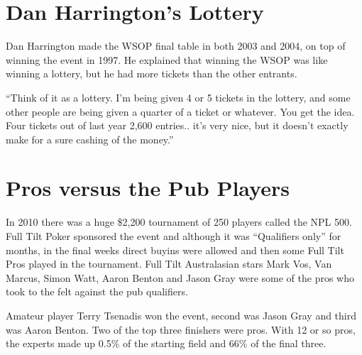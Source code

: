 \section{Dan Harrington's Lottery}

Dan Harrington made the WSOP final table in both 2003 and 2004, on top
of winning the event in 1997. He explained that winning the WSOP was
like winning a lottery, but he had more tickets than the other
entrants.

``Think of it as a lottery. I'm being given 4 or 5 tickets in the
lottery, and some other people are being given a quarter of a ticket
or whatever. You get the idea. Four tickets out of last year 2,600
entries.. it's very nice, but it doesn't exactly make for a sure
cashing of the money.''

\section{Pros versus the Pub Players}

In 2010 there was a huge \$2,200 tournament of 250 players called the
NPL 500. Full Tilt Poker sponsored the event and although it was
``Qualifiers only'' for months, in the final weeks direct buyins were
allowed and then some Full Tilt Pros played in the tournament. 
Full Tilt Australasian stars Mark Vos, Van Marcus, Simon Watt, Aaron
Benton and Jason Gray were some of the pros who took to the felt
against the pub qualifiers. 

Amateur player Terry Tsenadis won the event, second was Jason Gray and
third was Aaron Benton. Two of the top three finishers were pros. With
12 or so pros, the experts made up 0.5\% of the starting field and
66\% of the final three.


